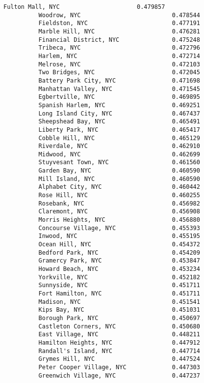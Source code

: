 \documentclass[11pt]{article}
\begin{document}
\begin{Verbatim}[commandchars=\\\{\}]
          Fulton Mall, NYC                      0.479857
          Woodrow, NYC                          0.478544
          Fieldston, NYC                        0.477191
          Marble Hill, NYC                      0.476281
          Financial District, NYC               0.475248
          Tribeca, NYC                          0.472796
          Harlem, NYC                           0.472714
          Melrose, NYC                          0.472103
          Two Bridges, NYC                      0.472045
          Battery Park City, NYC                0.471698
          Manhattan Valley, NYC                 0.471545
          Egbertville, NYC                      0.469895
          Spanish Harlem, NYC                   0.469251
          Long Island City, NYC                 0.467437
          Sheepshead Bay, NYC                   0.465491
          Liberty Park, NYC                     0.465417
          Cobble Hill, NYC                      0.465129
          Riverdale, NYC                        0.462910
          Midwood, NYC                          0.462699
          Stuyvesant Town, NYC                  0.461560
          Garden Bay, NYC                       0.460590
          Mill Island, NYC                      0.460590
          Alphabet City, NYC                    0.460442
          Rose Hill, NYC                        0.460255
          Rosebank, NYC                         0.456982
          Claremont, NYC                        0.456908
          Morris Heights, NYC                   0.456880
          Concourse Village, NYC                0.455393
          Inwood, NYC                           0.455195
          Ocean Hill, NYC                       0.454372
          Bedford Park, NYC                     0.454209
          Gramercy Park, NYC                    0.453847
          Howard Beach, NYC                     0.453234
          Yorkville, NYC                        0.452182
          Sunnyside, NYC                        0.451711
          Fort Hamilton, NYC                    0.451711
          Madison, NYC                          0.451541
          Kips Bay, NYC                         0.451031
          Borough Park, NYC                     0.450697
          Castleton Corners, NYC                0.450680
          East Village, NYC                     0.448211
          Hamilton Heights, NYC                 0.447912
          Randall's Island, NYC                 0.447714
          Grymes Hill, NYC                      0.447524
          Peter Cooper Village, NYC             0.447303
          Greenwich Village, NYC                0.447237

\end{Verbatim}
\end{document}
